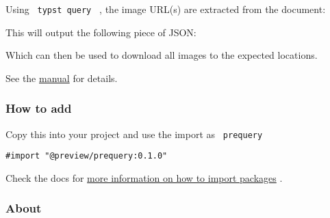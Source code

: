 Using \texttt{\ typst\ query\ } , the image URL(s) are extracted from
the document:

\begin{Shaded}
\begin{Highlighting}[]
\DataTypeTok{\textbackslash{}}
\StringTok{\textquotesingle{}\textquotesingle{}}
\end{Highlighting}
\end{Shaded}

This will output the following piece of JSON:

\begin{Shaded}
\begin{Highlighting}[]
\OtherTok{[}\FunctionTok{\{}\FunctionTok{:} \FunctionTok{,} \FunctionTok{:} \FunctionTok{\}}\OtherTok{]}
\end{Highlighting}
\end{Shaded}

Which can then be used to download all images to the expected locations.

See the
\href{https://github.com/typst/packages/raw/main/packages/preview/prequery/0.1.0/docs/manual.pdf}{manual}
for details.

\subsubsection{How to add}\label{how-to-add}

Copy this into your project and use the import as \texttt{\ prequery\ }

\begin{verbatim}
#import "@preview/prequery:0.1.0"
\end{verbatim}



Check the docs for
\href{https://typst.app/docs/reference/scripting/\#packages}{more
information on how to import packages} .

\subsubsection{About}\label{about}

